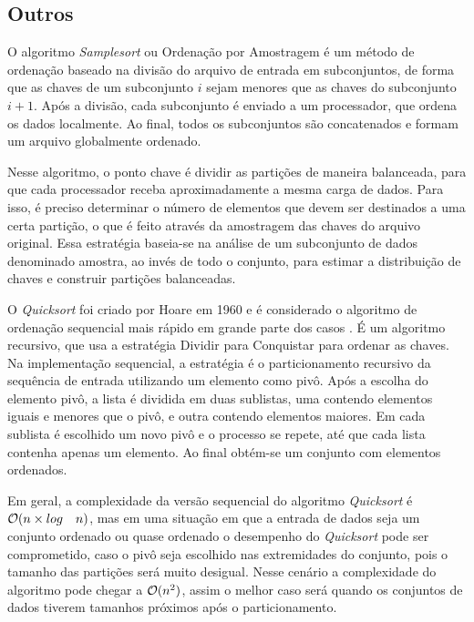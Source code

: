 \subsection{Outros}
\label{sec:alg-outros}

O algoritmo \textit{Samplesort} ou Ordenação por Amostragem é um método de ordenação baseado na divisão do arquivo de entrada em subconjuntos, de forma que as chaves de um subconjunto $i$ sejam menores que as chaves do subconjunto $i+1$. Após a divisão, cada subconjunto é enviado a um processador, que ordena os dados localmente. Ao final, todos os subconjuntos são concatenados e formam um arquivo globalmente ordenado.

Nesse algoritmo, o ponto chave é dividir as partições de maneira balanceada, para que cada processador receba aproximadamente a mesma carga de dados. Para isso, é preciso determinar o número de elementos que devem ser destinados a uma certa partição, o que é feito através da amostragem das chaves do arquivo original. Essa estratégia baseia-se na análise de um subconjunto de dados  denominado amostra, ao invés de todo o conjunto, para estimar a distribuição de chaves e construir partições balanceadas.



O \textit{Quicksort} foi criado por Hoare em 1960 e é considerado o algoritmo de ordenação sequencial mais rápido em grande parte dos casos \cite{Cormen:2009}. É um algoritmo recursivo, que usa a estratégia Dividir para Conquistar para ordenar as chaves.
Na implementação sequencial, a estratégia é o particionamento recursivo da sequência de entrada utilizando um elemento como pivô.  
Após a escolha do elemento pivô, a lista é dividida em duas sublistas, uma contendo elementos iguais e menores que o pivô,  e outra contendo elementos maiores.
Em cada sublista é escolhido um novo pivô e o processo se repete, até que cada lista contenha apenas um elemento.  Ao final obtém-se um conjunto com elementos ordenados. 

Em geral, a complexidade da versão sequencial do algoritmo \textit{Quicksort} é ${\cal O}(n \times log \quad n)$, mas em uma situação em que a entrada de dados seja um  conjunto ordenado ou quase ordenado o desempenho do \textit{Quicksort} pode ser comprometido, caso o pivô seja escolhido nas extremidades do conjunto, pois o tamanho das partições será muito desigual. Nesse cenário a complexidade do algoritmo pode chegar a ${\cal O}(n^2)$, assim o melhor caso será quando os conjuntos de dados tiverem tamanhos próximos após o particionamento.

